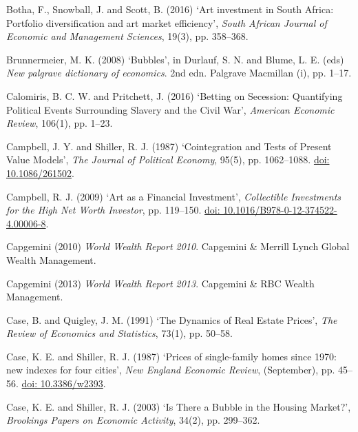 \documentclass[12pt,]{article}
\begin{document}
Botha, F., Snowball, J. and Scott, B. (2016) `Art investment in South
Africa: Portfolio diversification and art market efficiency',
\emph{South African Journal of Economic and Management Sciences}, 19(3),
pp. 358--368.

Brunnermeier, M. K. (2008) `Bubbles', in Durlauf, S. N. and Blume, L. E.
(eds) \emph{New palgrave dictionary of economics}. 2nd edn. Palgrave
Macmillan (i), pp. 1--17.

Calomiris, B. C. W. and Pritchett, J. (2016) `Betting on Secession:
Quantifying Political Events Surrounding Slavery and the Civil War',
\emph{American Economic Review}, 106(1), pp. 1--23.

Campbell, J. Y. and Shiller, R. J. (1987) `Cointegration and Tests of
Present Value Models', \emph{The Journal of Political Economy}, 95(5),
pp. 1062--1088.
\href{http://doi.org/10.1086/261502}{doi: 10.1086/261502}.

Campbell, R. J. (2009) `Art as a Financial Investment',
\emph{Collectible Investments for the High Net Worth Investor}, pp.
119--150.
\href{http://doi.org/10.1016/B978-0-12-374522-4.00006-8}{doi: 10.1016/B978-0-12-374522-4.00006-8}.

Capgemini (2010) \emph{World Wealth Report 2010}. Capgemini \& Merrill
Lynch Global Wealth Management.

Capgemini (2013) \emph{World Wealth Report 2013}. Capgemini \& RBC
Wealth Management.

Case, B. and Quigley, J. M. (1991) `The Dynamics of Real Estate Prices',
\emph{The Review of Economics and Statistics}, 73(1), pp. 50--58.

Case, K. E. and Shiller, R. J. (1987) `Prices of single-family homes
since 1970: new indexes for four cities', \emph{New England Economic
Review}, (September), pp. 45--56.
\href{http://doi.org/10.3386/w2393}{doi: 10.3386/w2393}.

Case, K. E. and Shiller, R. J. (2003) `Is There a Bubble in the Housing
Market?', \emph{Brookings Papers on Economic Activity}, 34(2), pp.
299--362.
\end{document}
